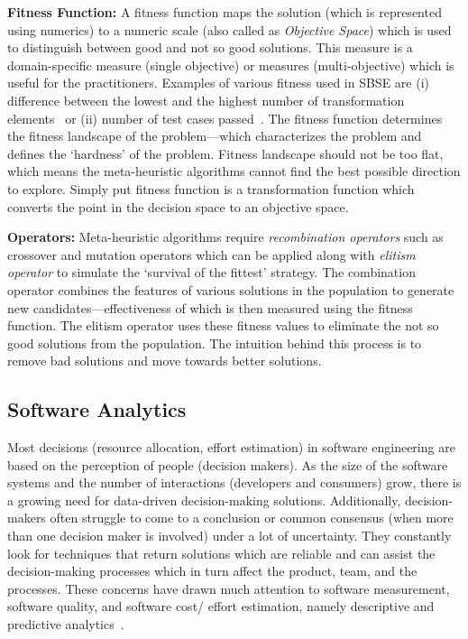 \documentclass[table, xcdraw, sigconf,review, anonymous]{acmart}
\begin{document}
\noindent\textbf{Fitness Function: } A fitness function maps the solution (which is represented using numerics) to a numeric scale (also called as \textit{Objective Space}) which is used to distinguish between good and not so good solutions. This measure is a domain-specific measure (single objective) or measures (multi-objective) which is useful for the practitioners. Examples of various fitness used in SBSE are (i) difference between the lowest
and the highest number of transformation elements~\cite{fleck2017model} or (ii) number of test cases passed~\cite{oliveira2016improved}. The fitness function determines the fitness landscape of the problem---which characterizes the problem and defines the `hardness' of the problem. Fitness landscape should not be too flat, which means the meta-heuristic algorithms cannot find the best possible direction to explore. Simply put fitness function is a transformation function which converts the point in the decision space to an objective space. 

\noindent\textbf{Operators: } Meta-heuristic algorithms require \textit{recombination operators} such as crossover and mutation operators which can be applied along with \textit{elitism operator} to simulate the `survival of the fittest' strategy. The combination operator combines the features of various solutions in the population to generate new candidates---effectiveness of which is then measured using the fitness function. The elitism operator uses these fitness values to eliminate the not so good solutions from the population. The intuition behind this process is to remove bad solutions and move towards better solutions. 



\subsection{Software Analytics}\label{sec:SA}
Most decisions (resource allocation, effort estimation) in software engineering are based on the perception of people (decision makers). As the size of the software systems and the number of interactions (developers and consumers) grow, there is a growing need for data-driven decision-making solutions. Additionally, decision-makers often struggle to come to a conclusion or common consensus (when more than one decision maker is involved) under a lot of uncertainty. They constantly look for techniques that return solutions which are reliable and can assist the decision-making processes which in turn affect the product, team, and the processes. These concerns have drawn much attention to software measurement, software quality, and software cost/ effort estimation, namely descriptive and predictive analytics~\cite{bener2015lessons}. 
\end{document}
